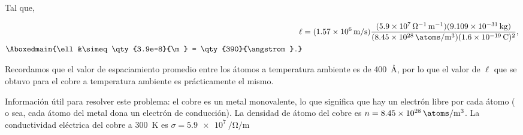 \documentclass[./../main.tex]{subfiles}
\begin{document}
\begin{exercise}
\begin{enumerate}
\begin{enumerate}[label = (b.\arabic*)]
\begin{solution}
                        Tal que,

                        \begin{align*}
                            \ell &= (\qty[per-mode=symbol]{1.57e6}{\m\per\s})\dfrac{(\qty[per-mode=power]{5.9e7}{\per\ohm\per\m})(\qty{9.109e-31}{\kg})}{(\qty[per-mode=symbol]{8.45e28}{\atoms\per\m\cubed})(\qty{1.6e-19}{\C})^{2}},\\
                            \Aboxedmain{\ell &\simeq \qty{3.9e-8}{\m} = \qty{390}{\angstrom}.}
                        \end{align*}

                        Recordamos que el valor de espaciamiento promedio entre los átomos a temperatura ambiente es de \qty{400}{\angstrom}, por lo que el valor de \(\ell\) que se obtuvo para el cobre a temperatura ambiente es prácticamente el mismo.
                    \end{solution}
                \end{enumerate}

                \color{blue}
                Información útil para resolver este problema: el cobre es un metal monovalente, lo que significa que hay un electrón libre por cada átomo ( o sea, cada átomo del metal dona un electrón de conducción). La densidad de átomo del cobre es \(n = \qty{8.45e28}{\atoms\per\m\cubed}\). La conductividad eléctrica del cobre a \qty{300}{\K} es \(\sigma = \qty[per-mode=power]{5.9e7}{\per\ohm\per\m}\)
        \end{enumerate}
    \end{exercise}
\end{document}
